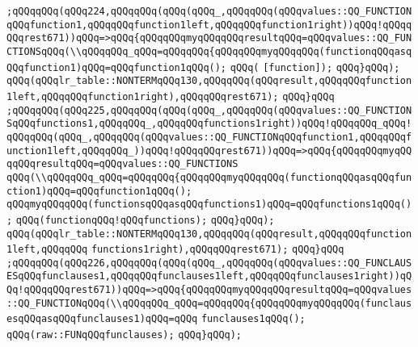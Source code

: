 \verb|;qQQqqQQq(qQQq224,qQQqqQQq(qQQq(qQQq_,qQQqqQQq(qQQqvalues::QQ_FUNCTIONqQQqfunction1,qQQqqQQqfunction1left,qQQqqQQqfunction1right))qQQq!qQQqqQQqrest671))qQQq=>qQQq{qQQqqQQqmyqQQqqQQqresultqQQq=qQQqvalues::QQ_FUNCTIONSqQQq(\\qQQqqQQq_qQQq=qQQqqQQq{qQQqqQQqmyqQQqqQQq(functionqQQqasqQQqfunction1)qQQq=qQQqfunction1qQQq();|\newline
\verb|qQQq(|\newline
\verb|[function]);|\newline
\verb|qQQq}qQQq);|\newline
\verb|qQQq(qQQqlr_table::NONTERMqQQq130,qQQqqQQq(qQQqresult,qQQqqQQqfunction1left,qQQqqQQqfunction1right),qQQqqQQqrest671);|\newline
\verb|qQQq}qQQq|\newline
\verb|;qQQqqQQq(qQQq225,qQQqqQQq(qQQq(qQQq_,qQQqqQQq(qQQqvalues::QQ_FUNCTIONSqQQqfunctions1,qQQqqQQq_,qQQqqQQqfunctions1right))qQQq!qQQqqQQq_qQQq!qQQqqQQq(qQQq_,qQQqqQQq(qQQqvalues::QQ_FUNCTIONqQQqfunction1,qQQqqQQqfunction1left,qQQqqQQq_))qQQq!qQQqqQQqrest671))qQQq=>qQQq{qQQqqQQqmyqQQqqQQqresultqQQq=qQQqvalues::QQ_FUNCTIONS|\newline
\verb|qQQq(\\qQQqqQQq_qQQq=qQQqqQQq{qQQqqQQqmyqQQqqQQq(functionqQQqasqQQqfunction1)qQQq=qQQqfunction1qQQq();|\newline
\verb|qQQqmyqQQqqQQq(functionsqQQqasqQQqfunctions1)qQQq=qQQqfunctions1qQQq();|\newline
\verb|qQQq(functionqQQq!qQQqfunctions);|\newline
\verb|qQQq}qQQq);|\newline
\verb|qQQq(qQQqlr_table::NONTERMqQQq130,qQQqqQQq(qQQqresult,qQQqqQQqfunction1left,qQQqqQQq|\newline
\verb|functions1right),qQQqqQQqrest671);|\newline
\verb|qQQq}qQQq|\newline
\verb|;qQQqqQQq(qQQq226,qQQqqQQq(qQQq(qQQq_,qQQqqQQq(qQQqvalues::QQ_FUNCLAUSESqQQqfunclauses1,qQQqqQQqfunclauses1left,qQQqqQQqfunclauses1right))qQQq!qQQqqQQqrest671))qQQq=>qQQq{qQQqqQQqmyqQQqqQQqresultqQQq=qQQqvalues::QQ_FUNCTIONqQQq(\\qQQqqQQq_qQQq=qQQqqQQq{qQQqqQQqmyqQQqqQQq(funclausesqQQqasqQQqfunclauses1)qQQq=qQQq|\newline
\verb|funclauses1qQQq();|\newline
\verb|qQQq(raw::FUNqQQqfunclauses);|\newline
\verb|qQQq}qQQq);|\newline
